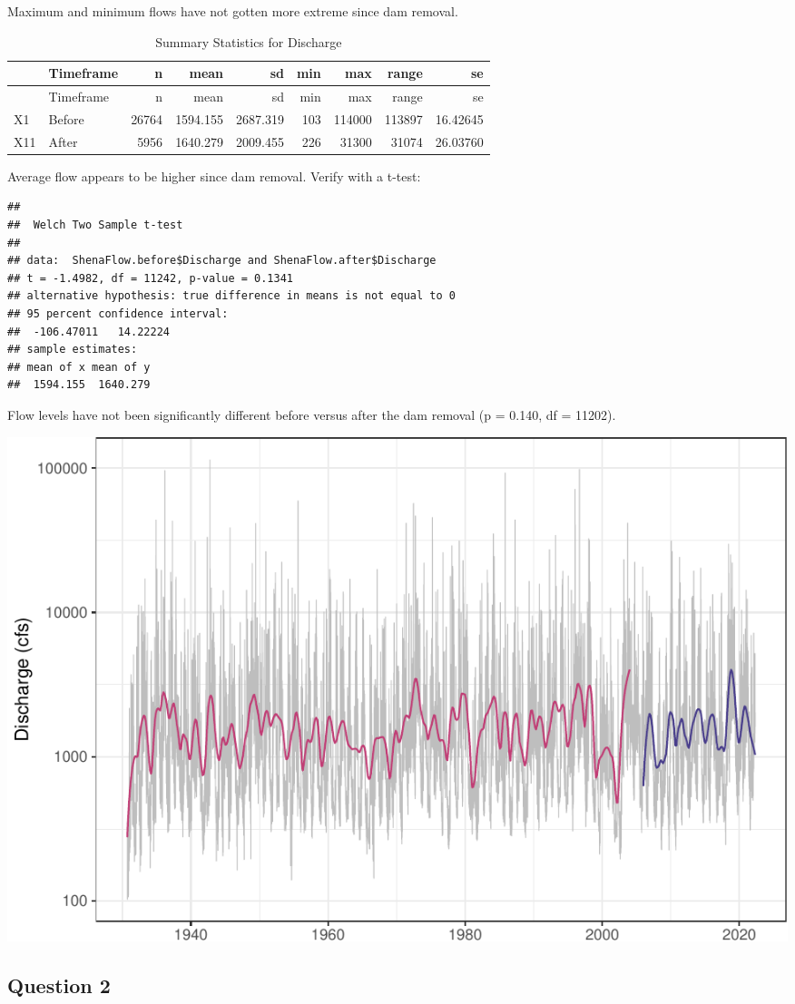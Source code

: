 \documentclass[
  12pt,
]{article}
\begin{document}
Maximum and minimum flows have not gotten more extreme since dam
removal.

\begin{longtable}[]{@{}llrrrrrrr@{}}
\caption{Summary Statistics for Discharge}\tabularnewline
\toprule
& Timeframe & n & mean & sd & min & max & range & se \\
\midrule
\endfirsthead
\toprule
& Timeframe & n & mean & sd & min & max & range & se \\
\midrule
\endhead
X1 & Before & 26764 & 1594.155 & 2687.319 & 103 & 114000 & 113897 &
16.42645 \\
X11 & After & 5956 & 1640.279 & 2009.455 & 226 & 31300 & 31074 &
26.03760 \\
\bottomrule
\end{longtable}

Average flow appears to be higher since dam removal. Verify with a
t-test:

\begin{verbatim}
## 
##  Welch Two Sample t-test
## 
## data:  ShenaFlow.before$Discharge and ShenaFlow.after$Discharge
## t = -1.4982, df = 11242, p-value = 0.1341
## alternative hypothesis: true difference in means is not equal to 0
## 95 percent confidence interval:
##  -106.47011   14.22224
## sample estimates:
## mean of x mean of y 
##  1594.155  1640.279
\end{verbatim}

Flow levels have not been significantly different before versus after
the dam removal (p = 0.140, df = 11202).

\includegraphics{Project_Template_files/figure-latex/flow_ts_graph-1.pdf}

\newpage

\hypertarget{question-2}{%
\subsection{Question 2}\label{question-2}}
\end{document}
